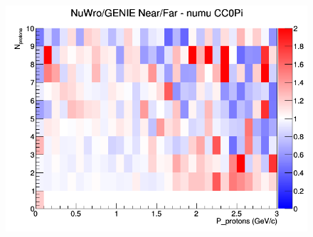 \documentclass[12pt]{article}
\begin{document}
\begin{figure}[h]
\endminipage
{}
\includegraphics[width=\linewidth]{N_P/nominal/protons/ratios/CC0Pi_NuWro_GENIE_numu_NF_N_P.png}
\endminipage
\newline
\end{figure}
\clearpage
\end{document}
